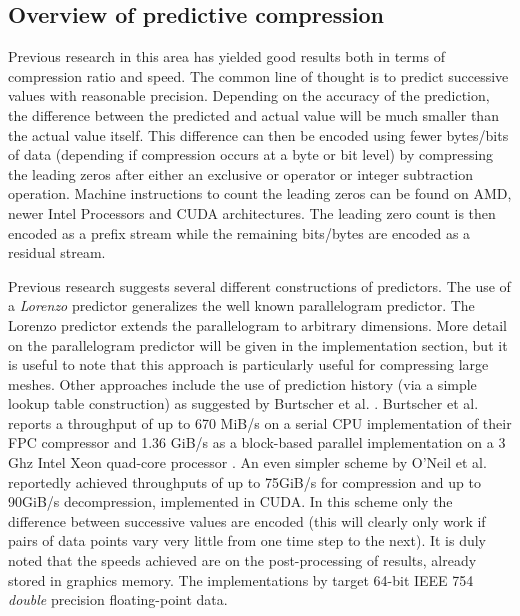 \subsection{Overview of predictive compression}
Previous research \cite{1607248,4589203,engelson2000lossless,lindstrom2006fast,O'Neil:2011:FDC:1964179.1964189,4976448,CGF:CGF681} in this area has yielded good results both in terms of compression ratio and speed. 
The common line of thought is to predict successive values with reasonable precision. Depending on the accuracy of the prediction, the difference between the predicted and actual value will be much smaller than the actual value itself. 
This difference can then be encoded using fewer bytes/bits of data (depending if compression occurs at a byte or bit level) by compressing the leading zeros after either an exclusive or operator or integer subtraction 
operation. Machine instructions to count the leading zeros can be found on AMD, newer Intel Processors and CUDA architectures. The leading zero count is then encoded as a prefix stream while the remaining bits/bytes 
are encoded as a residual stream.

Previous research suggests several different constructions of predictors. The use of a \textit{Lorenzo} predictor \cite{lindstrom2006fast,CGF:CGF681} generalizes the well known parallelogram predictor. 
The Lorenzo predictor extends the parallelogram to arbitrary dimensions. More detail on the parallelogram predictor will be given
in the implementation section, but it is useful to note that this approach is particularly useful for compressing large meshes. Other approaches include the use of prediction history 
(via a simple lookup table construction) as suggested by Burtscher et al. \cite{1607248,4589203,4976448}. Burtscher et al. reports a throughput of up to 670 MiB/s on a serial CPU implementation of their FPC 
compressor and 1.36 GiB/s as a block-based parallel implementation on a 3 Ghz Intel Xeon quad-core processor \cite{4976448}. An even simpler scheme by O'Neil et al. \cite{O'Neil:2011:FDC:1964179.1964189} reportedly 
achieved throughputs of up to 75GiB/s for compression and up to 90GiB/s decompression, implemented in CUDA. In this scheme only the difference between successive values are encoded (this will clearly only work if 
pairs of data points vary very little from one time step to the next). It is duly noted that the speeds achieved  are on the post-processing of results, already stored in graphics memory. 
The implementations by \cite{O'Neil:2011:FDC:1964179.1964189,1607248,4589203,4976448,engelson2000lossless} target 64-bit IEEE 754 \textit{double} precision floating-point data.

